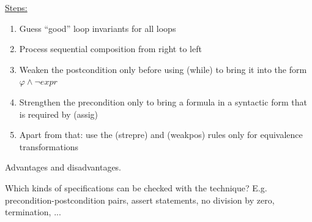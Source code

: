 \documentclass[a4paper]{article}
\begin{document}
\begin{minipage}[t]{0.16\linewidth}
\begin{betterlist}
{{\begin{betterlist}
\begin{betterlist}
					\end{betterlist}
					\item \underline{Steps:}
					\begin{enumerate}
						\item  Guess \enquote{good} loop invariants for all loops
						\item  Process sequential composition from right to left
						\item Weaken the postcondition only before using (while) to bring it into the form $\varphi \land \neg expr$
						\item Strengthen the precondition only to bring a formula in a syntactic form that is required by (assig)
						\item Apart from that: use the (strepre) and (weakpos) rules only for equivalence transformations
					\end{enumerate}
				\end{betterlist}
			}}
    \item Advantages and disadvantages.
		\item Which kinds of specifications can be checked with the technique? E.g. precondition-postcondition pairs, assert statements, no division by zero, termination, ...


\end{betterlist}
\end{minipage}
\end{document}
